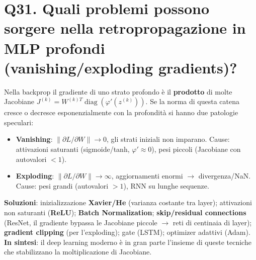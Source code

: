 \documentclass[11pt,a4paper]{article}
\begin{document}
\section*{Q31. Quali problemi possono sorgere nella retropropagazione in MLP profondi (vanishing/exploding gradients)?}
Nella backprop il gradiente di uno strato profondo è il \textbf{prodotto} di molte Jacobiane $J^{(k)} = W^{(k)T} \operatorname{diag}(\varphi '(z^{(k)}))$. Se la norma di questa catena cresce o decresce esponenzialmente con la profondità si hanno due patologie speculari:
\begin{itemize}
\item \textbf{Vanishing}: $\|\partial L/\partial W\| \to  0$, gli strati iniziali non imparano. Cause: attivazioni saturanti (sigmoide/tanh, $\varphi '\approx 0$), pesi piccoli (Jacobiane con autovalori $<1$).
\item \textbf{Exploding}: $\|\partial L/\partial W\| \to  \infty $, aggiornamenti enormi $\to $ divergenza/NaN. Cause: pesi grandi (autovalori $>1$), RNN su lunghe sequenze.
\end{itemize}
\textbf{Soluzioni}: inizializzazione \textbf{Xavier/He} (varianza costante tra layer); attivazioni non saturanti (\textbf{ReLU}); \textbf{Batch Normalization}; \textbf{skip/residual connections} (ResNet, il gradiente bypassa le Jacobiane piccole $\to $ reti di centinaia di layer); \textbf{gradient clipping} (per l'exploding); gate (LSTM); optimizer adattivi (Adam).
\textbf{In sintesi}: il deep learning moderno è in gran parte l'insieme di queste tecniche che stabilizzano la moltiplicazione di Jacobiane.
\newpage
\end{document}
